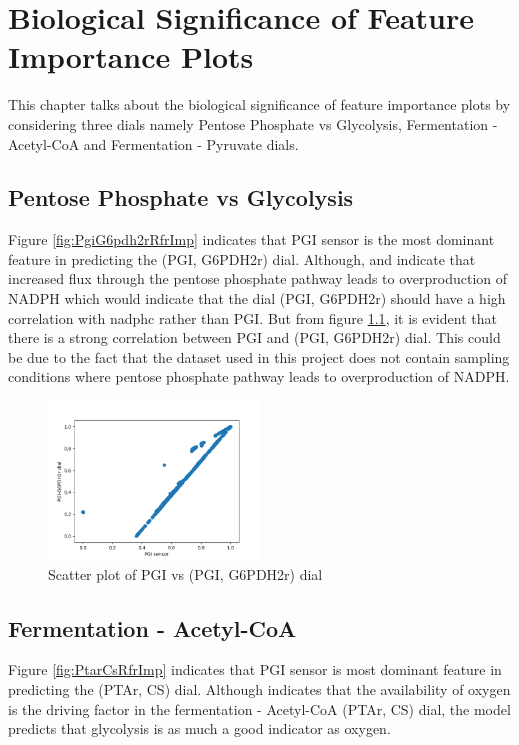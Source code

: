\documentclass[12pt,chapterheads]{ucsd}
\begin{document}

\chapter{Biological Significance of Feature Importance Plots}\label{chap:bioSig}
 This chapter talks about the biological significance of feature importance plots by considering three dials namely Pentose Phosphate vs Glycolysis, Fermentation - Acetyl-CoA and Fermentation - Pyruvate dials.
\section{Pentose Phosphate vs Glycolysis}
Figure \ref{fig:PgiG6pdh2rRfrImp} indicates that PGI sensor is the most dominant feature in predicting the (PGI, G6PDH2r) dial. Although, \cite{pmid16899} and \cite{Fraenkel1967} indicate that increased flux through the pentose phosphate pathway leads to overproduction of NADPH which would indicate that the dial (PGI, G6PDH2r) should have a high correlation with nadph\textunderscore c rather than PGI. But from figure \ref{fig:PGIvsPGIG6PDH2rDial}, it is evident that there is a strong correlation between PGI and (PGI, G6PDH2r) dial. This could be due to the fact that the dataset used in this project does not contain sampling conditions where pentose phosphate pathway leads to overproduction of NADPH.
\begin{figure}[h] 
\centering
\includegraphics[width=0.5\textwidth]{Figures/PGI_PGI_G6PDH2r_new.png}
\caption[Scatter plot of PGI vs (PGI, G6PDH2r) dial]
{Scatter plot of PGI vs (PGI, G6PDH2r) dial}
\label{fig:PGIvsPGIG6PDH2rDial}
\end{figure}

\section{Fermentation - Acetyl-CoA}
Figure \ref{fig:PtarCsRfrImp} indicates that PGI sensor is most dominant feature in predicting the (PTAr, CS) dial. Although \cite{pmid9484901} indicates that the availability of oxygen is the driving factor in the fermentation - Acetyl-CoA (PTAr, CS) dial, the model predicts that glycolysis is as much a good indicator as oxygen. 
\end{document}
